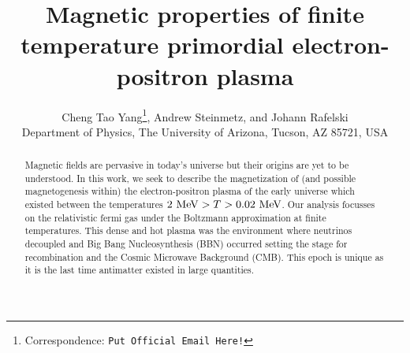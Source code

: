 \documentclass[a4paper]{article}
\title{\boldmath Magnetic properties of finite temperature primordial electron-positron plasma}
\author{Cheng Tao Yang\orc{\orcB}\thanks{Correspondence: \texttt{Put Official Email Here!}}, Andrew Steinmetz\orc{\orcC}, and Johann Rafelski\orc{\orcA}\\ Department of Physics, The University of Arizona, Tucson, AZ 85721, USA}
\begin{document}
\maketitle

\begin{abstract}
    Magnetic fields are pervasive in today's universe but their origins are yet to be understood. In this work, we seek to describe the magnetization of (and possible magnetogenesis within) the electron-positron plasma of the early universe which existed between the temperatures $2\text{ MeV}>T>0.02\text{ MeV}$. Our analysis focusses on the relativistic fermi gas under the Boltzmann approximation at finite temperatures. This dense and hot plasma was the environment where neutrinos decoupled and Big Bang Nucleosynthesis (BBN) occurred setting the stage for recombination and the Cosmic Microwave Background (CMB). This epoch is unique as it is the last time antimatter existed in large quantities.
\end{abstract}


\end{document}
